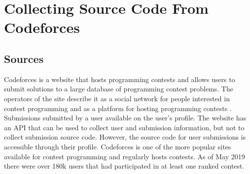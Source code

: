 \documentclass{article}
\begin{document}
\section{Collecting Source Code From Codeforces}


\subsection{Sources}
\begin{sloppypar}
Codeforces is a website that hosts programming contests and allows users to submit solutions to a large database of programming contest problems. The operators of the site describe it as a social network for people interested in contest programming and as a platform for hosting programming contests \cite{WEBSITE:CF1}. Submissions submitted by a user available on the user's profile. The website has an API that can be used to collect user and submission information, but not to collect submission source code. However, the source code for user submissions is accessible through their profile. Codeforces is one of the more popular sites available for contest programming and regularly hosts contests. As of May 2019 there were over 180k users that had participated in at least one ranked contest.
\end{sloppypar}

\end{document}
